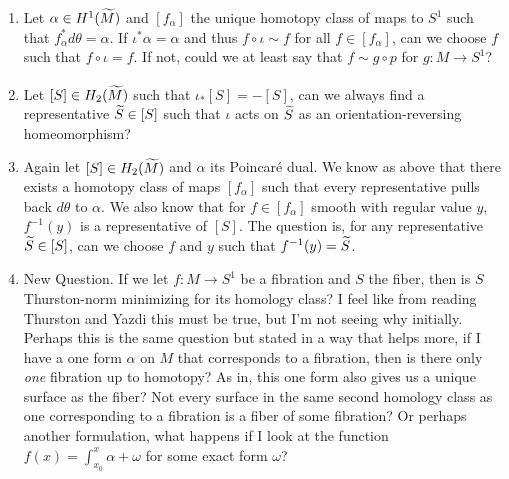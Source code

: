\begin{enumerate}
    \item Let $\alpha \in H^1(\widetilde{M})$ and $[f_\alpha]$ the unique homotopy class of maps to $S^1$ such that $f_\alpha^*d\theta = \alpha$. If $\iota^*\alpha = \alpha$ and thus $f \circ \iota \sim f$ for all $f \in [f_\alpha]$, can we choose $f$ such that $f \circ \iota = f$. If not, could we at least say that $f \sim g \circ p$ for $g:M \xrightarrow[]{} S^1$?
    \item Let $[S] \in H_2(\widetilde{M})$ such that $\iota_*[S] = -[S]$, can we always find a representative $\widetilde{S} \in [S]$ such that $\iota$ acts on $\widetilde{S}$ as an orientation-reversing homeomorphism?
    \item Again let $[S] \in H_2(\widetilde{M})$ and $\alpha$ its Poincar\'e dual. We know as above that there exists a homotopy class of maps $[f_\alpha]$ such that every representative pulls back $d\theta$ to $\alpha$. We also know that for $f \in [f_\alpha]$ smooth with regular value $y$, $f^{-1}(y)$ is a representative of $[S]$. The question is, for any representative $\widetilde{S} \in [S]$, can we choose $f$ and $y$ such that $f^{-1}(y) =
    \widetilde{S}$.
    
    \item New Question. If we let $f: M \xrightarrow{} S^1$ be a fibration and $S$ the fiber, then is $S$ Thurston-norm minimizing for its homology class? I feel like from reading Thurston and Yazdi this must be true, but I'm not seeing why initially. Perhaps this is the same question but stated in a way that helps more, if I have a one form $\alpha$ on $M$ that corresponds to a fibration, then is there only \textit{one} fibration up to homotopy? As in, this one form also gives us a unique surface as the fiber? Not every surface in the same second homology class as one corresponding to a fibration is a fiber of some fibration? Or perhaps another formulation, what happens if I look at the function $f(x) = \int_{x_0}^x \alpha + \omega$ for some exact form $\omega$?
\end{enumerate}
